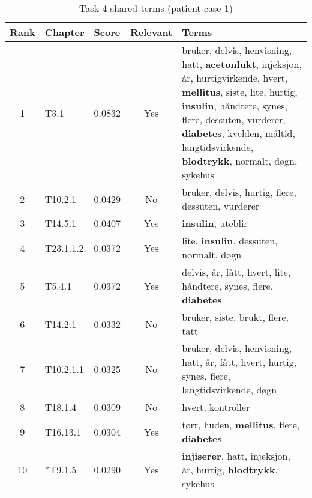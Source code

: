 \begin{table}[htbp] \footnotesize \center
\caption{Task 4 shared terms (patient case 1)\label{tab:terms}}
\begin{tabularx}{\textwidth}{c l l c X}
    \toprule
    Rank & Chapter & Score & Relevant & Terms \\
    \midrule
	1 & T3.1 & 0.0832 & Yes & bruker, delvis, henvisning, hatt, \textbf{acetonlukt}, injeksjon, år, hurtigvirkende, hvert, \textbf{mellitus}, siste, lite, hurtig, \textbf{insulin}, håndtere, synes, flere, dessuten, vurderer, \textbf{diabetes}, kvelden, måltid, langtidsvirkende, \textbf{blodtrykk}, normalt, døgn, sykehus \\
	2 & T10.2.1 & 0.0429 & No & bruker, delvis, hurtig, flere, dessuten, vurderer \\
	3 & T14.5.1 & 0.0407 & Yes & \textbf{insulin}, uteblir \\
	4 & T23.1.1.2 & 0.0372 & Yes & lite, \textbf{insulin}, dessuten, normalt, døgn \\
	5 & T5.4.1 & 0.0372 & Yes & delvis, år, fått, hvert, lite, håndtere, synes, flere, \textbf{diabetes} \\
	6 & T14.2.1 & 0.0332 & No & bruker, siste, brukt, flere, tatt \\
	7 & T10.2.1.1 & 0.0325 & No & bruker, delvis, henvisning, hatt, år, fått, hvert, hurtig, synes, flere, langtidsvirkende, døgn \\
	8 & T18.1.4 & 0.0309 & No & hvert, kontroller \\
	9 & T16.13.1 & 0.0304 & Yes & tørr, huden, \textbf{mellitus}, flere, \textbf{diabetes} \\
	10 & *T9.1.5 & 0.0290 & Yes & \textbf{injiserer}, hatt, injeksjon, år, hurtig, \textbf{blodtrykk}, sykehus \\
	\bottomrule
\end{tabularx}
\end{table}

